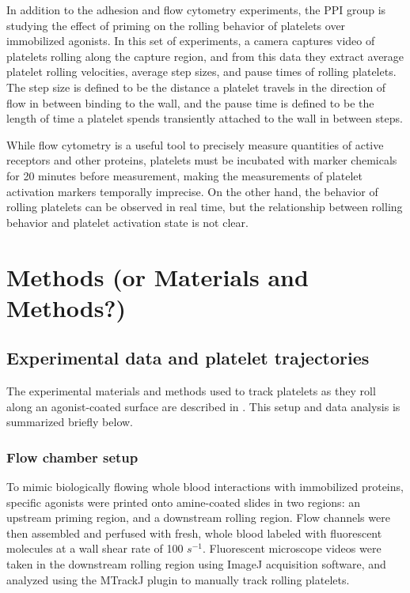\documentclass{biophys-new}
\begin{document}
In addition to the adhesion and flow cytometry experiments, the PPI
group is studying the effect of priming on the rolling behavior of
platelets over immobilized agonists. In this set of experiments, a
camera captures video of platelets rolling along the capture region,
and from this data they extract average platelet rolling velocities,
average step sizes, and pause times of rolling platelets. The step
size is defined to be the distance a platelet travels in the direction
of flow in between binding to the wall, and the pause time is defined
to be the length of time a platelet spends transiently attached to the
wall in between steps.

While flow cytometry is a useful tool to precisely measure quantities
of active receptors and other proteins, platelets must be incubated
with marker chemicals for 20 minutes before measurement, making the
measurements of platelet activation markers temporally imprecise. On
the other hand, the behavior of rolling platelets can be observed in
real time, but the relationship between rolling behavior and platelet
activation state is not clear. 

\section*{Methods (or Materials and Methods?)}

\subsection*{Experimental data and platelet trajectories}

The experimental materials and methods used to track platelets as they
roll along an agonist-coated surface are described in
\cite{Pumford2021}. This setup and data analysis is summarized briefly
below.

\subsubsection*{Flow chamber setup}

To mimic biologically flowing whole blood interactions with
immobilized proteins, specific agonists were printed onto amine-coated
slides in two regions: an upstream priming region, and a downstream
rolling region. Flow channels were then assembled and perfused with
fresh, whole blood labeled with fluorescent molecules at a wall shear
rate of 100 $s^{-1}$. Fluorescent microscope videos were taken in the
downstream rolling region using ImageJ acquisition software, and
analyzed using the MTrackJ plugin to manually track rolling platelets.
\end{document}

